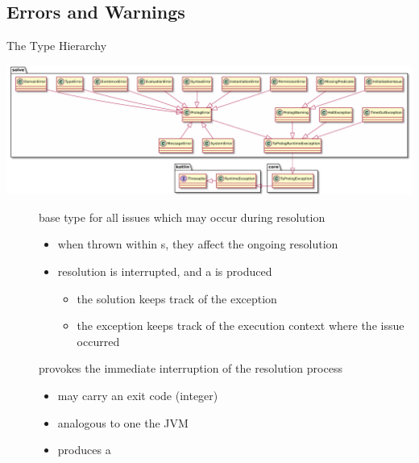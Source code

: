 \documentclass[handout]{beamer}
\begin{document}
\subsection{Errors and Warnings}

\begin{frame}[allowframebreaks]{The  Type Hierarchy}

    \begin{center}
        \includegraphics[width=\linewidth]{img/errors.pdf}
    \end{center}

    \framebreak

    \begin{description}
        \item[] base type for all issues which may occur during resolution
        \begin{itemize}\small
            \item when thrown \alert{within s}, they affect the ongoing resolution
            \item resolution is interrupted, and a  is produced
            \begin{itemize}\scriptsize
                \item the solution keeps track of the exception
                \item the exception keeps track of the execution context where the issue occurred
            \end{itemize}
        \end{itemize}

        \item[] provokes the immediate interruption of the resolution process
        \begin{itemize}\small
            \item may carry an \alert{exit code} (integer)
            \item analogous to  one the JVM
            \item produces a 
        \end{itemize}


\end{description}
\end{frame}
\end{document}
